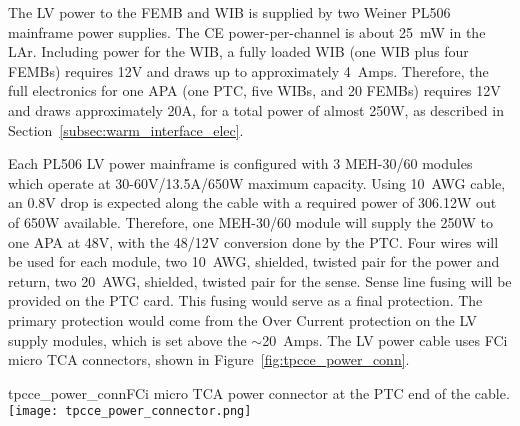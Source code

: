 The LV power to the FEMB and WIB is supplied by two Weiner PL506 mainframe power supplies.
The CE power-per-channel is about 25~mW in the LAr.
Including power for the WIB, a fully loaded WIB (one WIB plus four FEMBs) requires
12V and draws up to approximately 4~Amps. Therefore, the full electronics for one APA (one PTC, five WIBs, and 20 FEMBs) 
requires 12V and draws approximately 20A, for a total power of almost 250W, as 
described in Section~\ref{subsec:warm_interface_elec}.

Each PL506 LV power mainframe is configured with 3 MEH-30/60 modules which
operate at 30-60V/13.5A/650W maximum capacity. Using 10~AWG cable, an 0.8V drop is expected along the cable with a
required power of 306.12W out of 650W available. %
Therefore, one MEH-30/60 module will supply the 250W to one APA at 48V, with the 48/12V conversion done by the PTC. 
Four wires will be used for each module, two 10~AWG,
shielded, twisted pair for the power and return, two 20~AWG, shielded, twisted pair for the sense. Sense line fusing will be
provided on the PTC card. This fusing would serve as
a final protection. The primary protection would come from the Over Current protection
on the LV supply modules, which is set above the $\sim$20~Amps. The LV power cable uses FCi micro TCA connectors, 
shown in Figure~\ref{fig:tpcce_power_conn}.





\begin{cdrfigure}{tpcce_power_conn}{FCi micro TCA power connector at the PTC end of the cable.}
\texttt{[image: tpcce\_power\_connector.png]} %
\end{cdrfigure}

